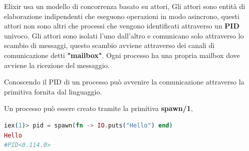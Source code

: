 Elixir usa un modello di concorrenza basato su attori,
Gli attori sono entità di elaborazione indipendenti
che eseguono operazioni in modo asincrono, questi attori
non sono altri che  processi che vengono identificati
attraverso un \textbf{PID} univoco.
Gli attori sono isolati l'uno dall'altro e
comunicano solo attraverso lo scambio di messaggi,
questo scambio avviene attraverso
dei canali di comunicazione detti \textbf{"mailbox"}.
Ogni processo ha una propria mailbox dove avviene la
ricezione del messaggio.

Conoscendo il PID di un processo può avvenire la comunicazione
attraverso la primitiva fornita dal linguaggio.

Un processo può essere creato tramite la primitiva \textbf{spawn/1},

\begin{lstlisting}[language=elixir, caption={Creazione processo},captionpos=b,
	label={lst:creazione_processo}]
iex(1)> pid = spawn(fn -> IO.puts("Hello") end)
Hello
#PID<0.114.0>
\end{lstlisting}